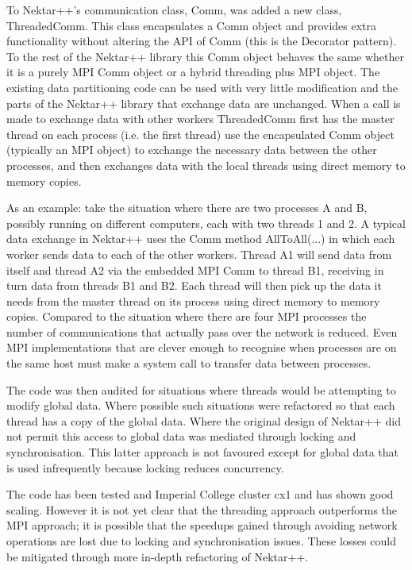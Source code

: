 To Nektar++’s communication class, Comm, was added a new class, ThreadedComm. 
This class encapsulates a Comm object and provides extra functionality without
altering the API of Comm (this is the Decorator pattern).  To the rest of the
Nektar++ library this Comm object behaves the same whether it is a purely MPI
Comm object or a hybrid threading plus MPI object.  The existing data
partitioning code can be used with very little modification and the parts of the
Nektar++ library that exchange data are unchanged.  When a call is made to
exchange data with other workers ThreadedComm first has the master thread on
each process (i.e. the first thread) use the encapsulated Comm object (typically
an MPI object) to exchange the necessary data between the other processes, and
then exchanges data with the local threads using direct memory to memory copies.

As an example: take the situation where there are two processes A and B,
possibly running on different computers, each with two threads 1 and 2.  A
typical data exchange in Nektar++ uses the Comm method AllToAll(...) in which
each worker sends data to each of the other workers.  Thread A1 will send data
from itself and thread A2 via the embedded MPI Comm to thread B1, receiving in
turn data from threads B1 and B2.  Each thread will then pick up the data it
needs from the master thread on its process using direct memory to memory
copies.  Compared to the situation where there are four MPI processes the number
of communications that actually pass over the network is reduced.  Even MPI
implementations that are clever enough to recognise when processes are on the
same host must make a system call to transfer data between processes.

The code was then audited for situations where threads would be attempting to
modify global data.  Where possible such situations were refactored so that each
thread has a copy of the global data.  Where the original design of Nektar++ did
not permit this access to global data was mediated through locking and
synchronisation.  This latter approach is not favoured except for global data
that is used infrequently because locking reduces concurrency.

The code has been tested and Imperial College cluster cx1 and has shown good
scaling.  However it is not yet clear that the threading approach outperforms
the MPI approach; it is possible that the speedups gained through avoiding
network operations are lost due to locking and synchronisation issues.  These
losses could be mitigated through more in-depth refactoring of Nektar++.